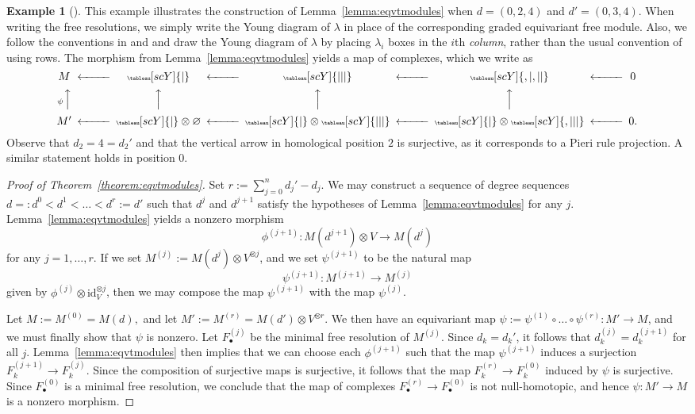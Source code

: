 \documentclass[12pt]{amsart}
\theoremstyle{definition}
\newtheorem{eg}[equation]{Example}
\newenvironment{example}[1][]{\begin{eg}[#1] \pushQED{\qed}}{\popQED \end{eg}}
\begin{document}
\begin{example} \label{example:eqvtres1}
  This example illustrates the construction of
  Lemma~\ref{lemma:eqvtmodules} when $d=(0,2,4)$ and $d'=(0,3,4)$.
  When writing the free resolutions, we simply write the Young
  diagram of $\lambda$ in place of the corresponding graded 
  equivariant free module. Also, we follow the conventions in
  \cite{efw} and \cite{sam} and draw the Young diagram of $\lambda$ by
  placing $\lambda_i$ boxes in the $i$th {\it column}, rather than the
  usual convention of using rows. The morphism from
  Lemma~\ref{lemma:eqvtmodules} yields a map of complexes, which we write as  
\[
\begin{CD}
  @.M@<<< {\tiny \tableau[scY]{|}} @<<< {\tiny \tableau[scY]{|||}}
  @<<< {\tiny
    \tableau[scY]{,|,||}} @<<< 0 \\
  @. _{\psi} @AAA@AAA @AAA @AAA  \\
  @. M'@<<< {\tiny \tableau[scY]{|}}\otimes \varnothing @<<< {\tiny
    \tableau[scY]{|}} \otimes {\tiny \tableau[scY]{|||}} @<<< {\tiny
    \tableau[scY]{|}} \otimes {\tiny \tableau[scY]{,|||}} @<<< 0.\\
\end{CD}
\]
Observe that $d_2=4=d_2'$ and that the vertical arrow in homological position $2$ is surjective, as it corresponds to a Pieri rule projection.  A similar statement holds in position $0$.
\end{example}


\begin{proof}[Proof of Theorem~\ref{theorem:eqvtmodules}] 
Set $r:=\sum_{j=0}^n d_j'-d_j$.  We may construct a sequence of degree sequences
$d=:d^0<d^1<\dots <d^r:=d'$ such that $d^j$ and $d^{j+1}$ satisfy the hypotheses of
Lemma~\ref{lemma:eqvtmodules} for any $j$.  
Lemma~\ref{lemma:eqvtmodules} yields a nonzero morphism
\[
\phi^{(j+1)} \colon M(d^{j+1})\otimes V\to M(d^j)
\]
for any $j=1, \dots, r$.
If we set $M^{(j)}:=M(d^j)\otimes V^{\otimes j}$, and we set $\psi^{(j+1)}$ to be the natural map
\[
\psi^{(j+1)} \colon M^{(j+1)}\to M^{(j)}
\]
given by $\phi^{(j)}\otimes \text{id}_V^{\otimes j}$, then we may compose the map $\psi^{(j+1)}$ with
the map $\psi^{(j)}$.

Let $M:=M^{(0)}=M(d),$ and let $M':=M^{(r)}=M(d')\otimes V^{\otimes r}$.
We then have an equivariant map $\psi:=\psi^{(1)}\circ \dots \circ
\psi^{(r)} \colon M'\to M$, and we must finally show that $\psi$ is
nonzero.  Let $F^{(j)}_\bullet$ be the minimal free resolution of
$M^{(j)}$.  Since $d_k=d_k'$, it follows that $d^{(j)}_k=d^{(j+1)}_k$
for all $j$.   Lemma~\ref{lemma:eqvtmodules} then implies that we can
choose each $\phi^{(j+1)}$ such that the map $\psi^{(j+1)}$ induces a
surjection $F^{(j+1)}_k\to F^{(j)}_k$.  Since the composition of
surjective maps is surjective, it follows that the map $F^{(r)}_k\to
F^{(0)}_k$ induced by $\psi$ is surjective.  Since $F^{(0)}_\bullet$
is a minimal free resolution, we conclude that the map of
complexes $F^{(r)}_\bullet\to F^{(0)}_\bullet$ is not 
null-homotopic, and hence $\psi \colon M'\to M$ is a nonzero morphism.
\end{proof}
\end{document}
